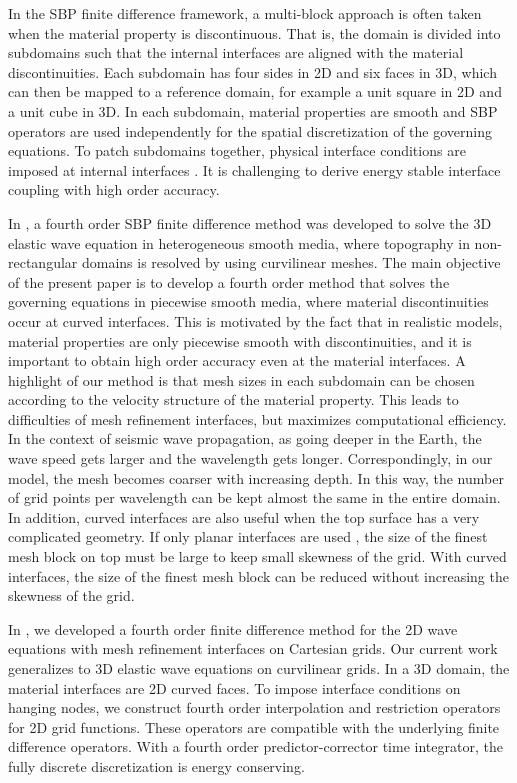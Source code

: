In the SBP finite difference framework, a multi-block approach is often taken when the material property is discontinuous. That is, the domain is divided into subdomains such that the internal interfaces are aligned with the material discontinuities. Each subdomain has four sides in 2D and six faces in 3D, which can then be mapped to a reference domain, for example a unit square in 2D and a unit cube in 3D. In each subdomain, material properties are smooth and SBP operators are  used independently  for the spatial discretization of the governing equations. To patch subdomains together, physical interface conditions are imposed at internal interfaces \cite{Almquist2019,duru2014stable}. It is challenging to derive energy stable interface coupling with high order accuracy. 

In \cite{petersson2015wave}, a fourth order SBP finite difference method was developed to solve the 3D elastic wave equation in heterogeneous smooth media, where topography in non-rectangular domains is resolved by using curvilinear meshes. The main objective of the present paper is to develop a fourth order method that solves the governing equations in piecewise smooth media, where material discontinuities occur at curved interfaces.   This is motivated by the fact that in realistic models, material properties are only piecewise smooth with discontinuities, and it is important to obtain high order accuracy even at the material interfaces. A highlight of our method is that mesh sizes in each subdomain can be chosen according to the velocity structure of the material property. This leads to difficulties of mesh refinement interfaces, but maximizes computational efficiency. In the context of seismic wave propagation, as going deeper in the Earth, the wave speed gets larger and the wavelength gets longer. Correspondingly, in our model, the mesh becomes coarser with increasing depth. In this way, the number of grid points per wavelength can be kept almost the same in the entire domain. In addition, curved interfaces are also useful when the top surface has a very complicated geometry. If only planar interfaces are used \cite{SW4}, the size of the finest mesh block on top must be large to keep small skewness of the grid. With curved interfaces, the size of the finest mesh block can be reduced without increasing the skewness of the grid. 

In \cite{wang2018fourth}, we developed a fourth order finite difference method for the 2D wave equations with mesh refinement interfaces on Cartesian grids. Our current work generalizes to 3D elastic wave equations on curvilinear grids. In a 3D domain, the material interfaces are 2D curved faces. To impose interface conditions on hanging nodes, we construct fourth order interpolation and restriction operators for 2D grid functions. These operators are compatible with the underlying finite difference operators. With a fourth order predictor-corrector time integrator, the fully discrete discretization is energy conserving. 

